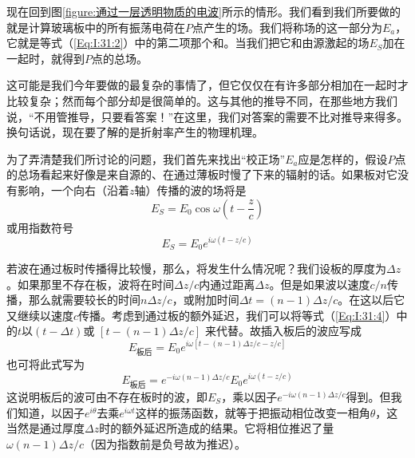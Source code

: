 现在回到图\ref{figure:通过一层透明物质的电波}所示的情形。我们看到我们所要做的就是计算玻璃板中的所有振荡电荷在$P$点产生的场。我们将称场的这一部分为$E_a$，它就是等式（\ref{Eq:I:31:2}）中的第二项那个和。当我们把它和由源激起的场$E_S$加在一起时，就得到$P$点的总场。

这可能是我们今年要做的最复杂的事情了，但它仅仅在有许多部分相加在一起时才比较复杂；然而每个部分却是很简单的。这与其他的推导不同，在那些地方我们说，“不用管推导，只要看答案！”在这里，我们对答案的需要不比对推导来得多。换句话说，现在要了解的是折射率产生的物理机理。

为了弄清楚我们所讨论的问题，我们首先来找出“校正场”$E_a$应是怎样的，假设$P$点的总场看起来好像是来自源的、在通过薄板时慢了下来的辐射的话。如果板对它没有影响，一个向右（沿着$z$轴）传播的波的场将是
\begin{equation}
    \label{Eq:I:31:3}
    E_S = E_0\cos\omega\left ( t - \frac{z}{c} \right )
\end{equation}
或用指数符号
\begin{equation}
    \label{Eq:I:31:4}
    E_S = E_0e^{i\omega(t-z/c)}
\end{equation}

若波在通过板时传播得比较慢，那么，将发生什么情况呢？我们设板的厚度为$\Delta z$。如果那里不存在板，波将在时间$\Delta z/c$内通过距离$\Delta z$。但是如果波以速度$c/n$传播，那么就需要较长的时间$n\Delta z/c$，或附加时间$\Delta t=(n-1)\Delta z/c$。在这以后它又继续以速度$c$传播。考虑到通过板的额外延迟，我们可以将等式（\ref{Eq:I:31:4}）中的$t$以$(t-\Delta t)$或 $[t-(n-1)\Delta z/c]$ 来代替。故插入板后的波应写成
\begin{equation}
    \label{Eq:I:31:5}
    E_\text{板后}=E_0e^{i\omega[t-(n-1)\Delta z/c - z/c]}
\end{equation}
也可将此式写为
\begin{equation}
    \label{Eq:I:31:6}
    E_\text{板后}=e^{-i\omega(n-1)\Delta z/c}E_0e^{i\omega(t-z/c)}
\end{equation}
这说明板后的波可由不存在板时的波，即$E_S$，乘以因子$e^{-i\omega(n-1)\Delta z/c}$得到。但我们知道，以因子$e^{i\theta}$去乘$e^{i\omega t}$这样的振荡函数，就等于把振动相位改变一相角$\theta$，这当然是通过厚度$\Delta z$时的额外延迟所造成的结果。它将相位推迟了量$\omega(n-1)\Delta z/c$（因为指数前是负号故为推迟）。

